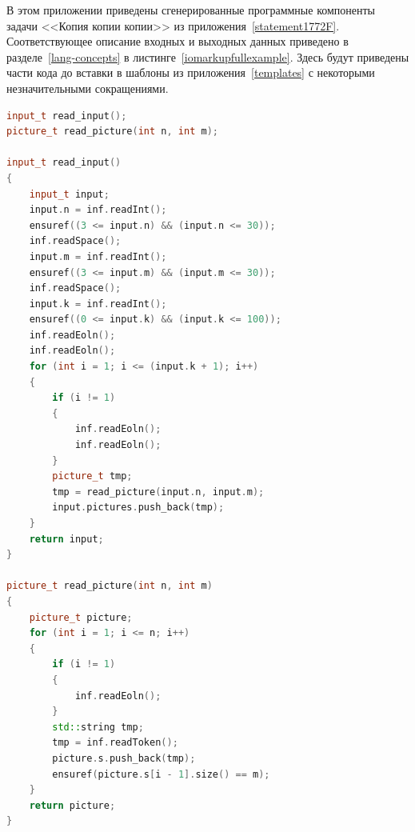 \documentclass[times,specification,annotation]{style/itmo-student-thesis/itmo-student-thesis}
\begin{document}
В этом приложении приведены сгенерированные программные компоненты задачи <<Копия копии копии>> из приложения~\ref{statement1772F}. Соответствующее описание входных и выходных данных приведено в разделе~\ref{lang-concepts} в листинге~\ref{iomarkupfullexample}. Здесь будут приведены части кода до вставки в шаблоны из приложения~\ref{templates} с некоторыми незначительными сокращениями.

\begin{lstlisting}[caption={Часть сгенерированного кода валидатора на языке C++},label={gen-val-cpp},language=C++]
input_t read_input();
picture_t read_picture(int n, int m);

input_t read_input()
{
    input_t input;
    input.n = inf.readInt();
    ensuref((3 <= input.n) && (input.n <= 30));
    inf.readSpace();
    input.m = inf.readInt();
    ensuref((3 <= input.m) && (input.m <= 30));
    inf.readSpace();
    input.k = inf.readInt();
    ensuref((0 <= input.k) && (input.k <= 100));
    inf.readEoln();
    inf.readEoln();
    for (int i = 1; i <= (input.k + 1); i++)
    {
        if (i != 1)
        {
            inf.readEoln();
            inf.readEoln();
        }
        picture_t tmp;
        tmp = read_picture(input.n, input.m);
        input.pictures.push_back(tmp);
    }
    return input;
}

picture_t read_picture(int n, int m)
{
    picture_t picture;
    for (int i = 1; i <= n; i++)
    {
        if (i != 1)
        {
            inf.readEoln();
        }
        std::string tmp;
        tmp = inf.readToken();
        picture.s.push_back(tmp);
        ensuref(picture.s[i - 1].size() == m);
    }
    return picture;
}
\end{lstlisting}
\end{document}
